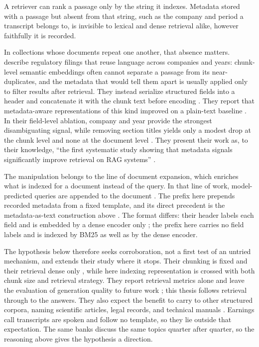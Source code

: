 A retriever can rank a passage only by the string it indexes. Metadata stored
with a passage but absent from that string, such as the company and period a
transcript belongs to, is invisible to lexical and dense retrieval alike,
however faithfully it is recorded.

In collections whose documents repeat one another, that absence matters.
\textcite[2]{yousuf2026} describe regulatory filings that reuse language across
companies and years: chunk-level semantic embeddings often cannot separate a
passage from its near-duplicates, and the metadata that would tell them apart is
usually applied only to filter results after retrieval. They instead serialize
structured fields into a header and concatenate it with the chunk text before
encoding \parencite[5]{yousuf2026}. They report that metadata-aware
representations of this kind improved on a plain-text baseline
\parencite[9]{yousuf2026}. In their field-level ablation, company and year
provide the strongest disambiguating signal, while removing section titles
yields only a modest drop at the chunk level and none at the document level
\parencite[12]{yousuf2026}. They present their work as, to their knowledge,
\enquote{the first systematic study showing that metadata signals significantly
improve retrieval on RAG systems} \parencite[3]{yousuf2026}.

The manipulation belongs to the line of document expansion, which enriches what
is indexed for a document instead of the query. In that line of work,
model-predicted queries are appended to the document \parencite{nogueira2019}.
The prefix here prepends recorded metadata from a fixed template, and its direct
precedent is the metadata-as-text construction above \parencite[5]{yousuf2026}.
The format differs: their header labels each field and is embedded by a dense
encoder only \parencite[5]{yousuf2026}; the prefix here carries no field
labels and is indexed by BM25 as well as by the dense encoder.

The hypothesis below therefore seeks corroboration, not a first test of an
untried mechanism, and extends their study where it stops. Their
chunking is fixed and their retrieval dense only \parencite[7--8]{yousuf2026},
while here indexing representation is crossed with both chunk size and retrieval
strategy. They report retrieval metrics alone and leave the evaluation of
generation quality to future work \parencite[8, 13]{yousuf2026}; this thesis
follows retrieval through to the answers. They also expect the benefit to carry
to other structured corpora, naming scientific articles, legal records, and
technical manuals \parencite[13]{yousuf2026}. Earnings call transcripts are
spoken and follow no template, so they lie outside that expectation. The same
banks discuss the same topics quarter after quarter, so the reasoning above
gives the hypothesis a direction.

